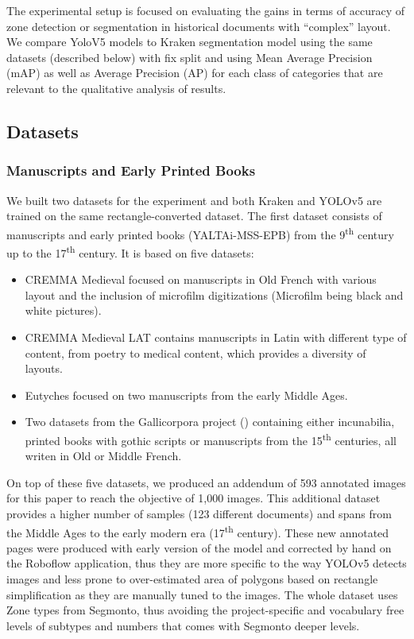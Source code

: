 \documentclass{jdmdh}
\begin{document}
The experimental setup is focused on evaluating the gains in terms of accuracy of zone detection or segmentation in historical documents with ``complex'' layout. We compare YoloV5 models to Kraken segmentation model using the same datasets (described below) with fix split and using Mean Average Precision (mAP) as well as Average Precision (AP) for each class of categories that are relevant to the qualitative analysis of results.

\subsection{Datasets}

\subsubsection{Manuscripts and Early Printed Books}

We built two datasets for the experiment and both Kraken and YOLOv5 are trained on the same rectangle-converted dataset. The first dataset consists of manuscripts and early printed books (YALTAi-MSS-EPB) from the 9\textsuperscript{th} century up to the 17\textsuperscript{th} century. It is based on five datasets:

\begin{itemize}
    \item CREMMA Medieval \citep{pinche2022cremma} focused on manuscripts in Old French with various layout and the inclusion of microfilm digitizations (Microfilm being black and white pictures).
    \item CREMMA Medieval LAT \citep{clerice2022cremma} contains manuscripts in Latin with different type of content, from poetry to medical content, which provides a diversity of layouts.
    \item Eutyches \citep{vlachou-efstathiou2022voss} focused on two manuscripts from the early Middle Ages.
    \item Two datasets from the Gallicorpora project (\citep{pinche2022mss, pinche2022goth}) containing either incunabilia, printed books with gothic scripts or manuscripts from the 15\textsuperscript{th} centuries, all writen in Old or Middle French.
\end{itemize}

On top of these five datasets, we produced an addendum of 593 annotated images for this paper to reach the objective of 1,000 images. This additional dataset provides a higher number of samples (123 different documents) and spans from the Middle Ages to the early modern era (17\textsuperscript{th} century). These new annotated pages were produced with early version of the model and corrected by hand on the Roboflow application, thus they are more specific to the way YOLOv5 detects images and less prone to over-estimated area of polygons based on rectangle simplification as they are manually tuned to the images. The whole dataset uses Zone types from Segmonto, thus avoiding the project-specific and vocabulary free levels of subtypes and numbers that comes with Segmonto deeper levels. 
\end{document}
